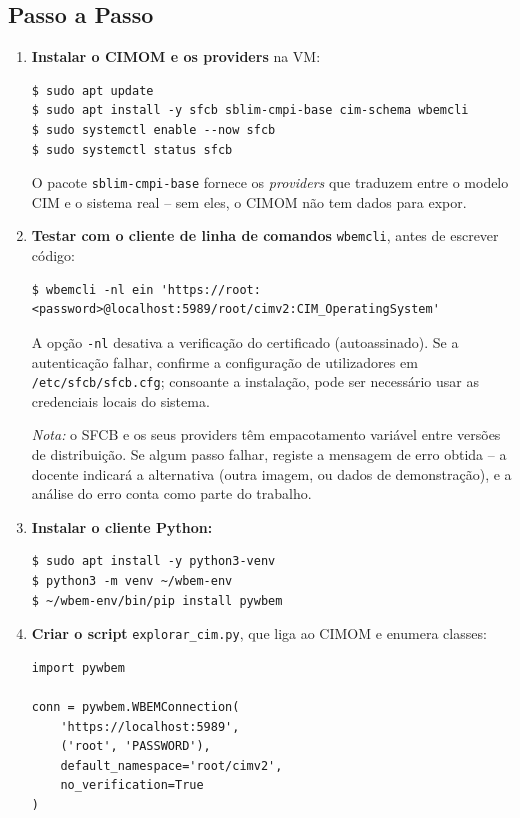 \documentclass[11pt,a4paper]{article}
\begin{document}
\subsection{Passo a Passo}
\begin{enumerate}[label=\arabic*.]

  \item \textbf{Instalar o CIMOM e os providers} na VM:
\begin{lstlisting}
$ sudo apt update
$ sudo apt install -y sfcb sblim-cmpi-base cim-schema wbemcli
$ sudo systemctl enable --now sfcb
$ sudo systemctl status sfcb
\end{lstlisting}
  O pacote \texttt{sblim-cmpi-base} fornece os \emph{providers} que traduzem entre o modelo CIM e o sistema real -- sem eles, o CIMOM não tem dados para expor.

  \item \textbf{Testar com o cliente de linha de comandos} \texttt{wbemcli}, antes de escrever código:
\begin{lstlisting}
$ wbemcli -nl ein 'https://root:<password>@localhost:5989/root/cimv2:CIM_OperatingSystem'
\end{lstlisting}
  A opção \texttt{-nl} desativa a verificação do certificado (autoassinado). Se a autenticação falhar, confirme a configuração de utilizadores em \texttt{/etc/sfcb/sfcb.cfg}; consoante a instalação, pode ser necessário usar as credenciais locais do sistema.

  \emph{Nota:} o SFCB e os seus providers têm empacotamento variável entre versões de distribuição. Se algum passo falhar, registe a mensagem de erro obtida -- a docente indicará a alternativa (outra imagem, ou dados de demonstração), e a análise do erro conta como parte do trabalho.

  \item \textbf{Instalar o cliente Python:}
\begin{lstlisting}
$ sudo apt install -y python3-venv
$ python3 -m venv ~/wbem-env
$ ~/wbem-env/bin/pip install pywbem
\end{lstlisting}

  \item \textbf{Criar o script} \texttt{explorar\_cim.py}, que liga ao CIMOM e enumera classes:
\begin{lstlisting}
import pywbem

conn = pywbem.WBEMConnection(
    'https://localhost:5989',
    ('root', 'PASSWORD'),
    default_namespace='root/cimv2',
    no_verification=True
)


\end{lstlisting}
\end{enumerate}
\end{document}
